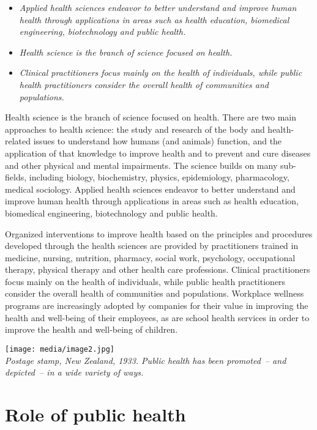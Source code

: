\begin{itemize}
\item
  \emph{Applied health sciences endeavor to better understand and
  improve human health through applications in areas such as health
  education, biomedical engineering, biotechnology and public health.}
\item
  \emph{Health science is the branch of science focused on health.}
\item
  \emph{Clinical practitioners focus mainly on the health of
  individuals, while public health practitioners consider the overall
  health of communities and populations.}
\end{itemize}

Health science is the branch of science focused on health. There are two
main approaches to health science: the study and research of the body
and health-related issues to understand how humans (and animals)
function, and the application of that knowledge to improve health and to
prevent and cure diseases and other physical and mental impairments. The
science builds on many sub-fields, including biology, biochemistry,
physics, epidemiology, pharmacology, medical sociology. Applied health
sciences endeavor to better understand and improve human health through
applications in areas such as health education, biomedical engineering,
biotechnology and public health.

Organized interventions to improve health based on the principles and
procedures developed through the health sciences are provided by
practitioners trained in medicine, nursing, nutrition, pharmacy, social
work, psychology, occupational therapy, physical therapy and other
health care professions. Clinical practitioners focus mainly on the
health of individuals, while public health practitioners consider the
overall health of communities and populations. Workplace wellness
programs are increasingly adopted by companies for their value in
improving the health and well-being of their employees, as are school
health services in order to improve the health and well-being of
children.

\texttt{[image: media/image2.jpg]}\\
\emph{Postage stamp, New Zealand, 1933. Public health has been
promoted~-- and depicted~-- in a wide variety of ways.}

\section{Role of public health}\label{role-of-public-health}

